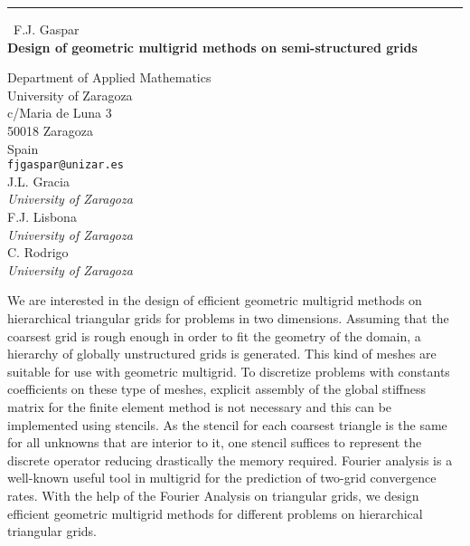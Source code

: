 \documentclass{report}
\begin{document}
\begin{center}
\rule{6in}{1pt} \
{\large F.J. Gaspar \\
{\bf Design of geometric multigrid methods on semi-structured grids}}

Department of Applied Mathematics \\ University of Zaragoza \\ c/Maria de Luna 3 \\ 50018 Zaragoza \\ Spain
\\
{\tt fjgaspar@unizar.es}\\
J.L. Gracia\\
{\em University of Zaragoza}\\
F.J. Lisbona\\
{\em University of Zaragoza}\\
C. Rodrigo\\
{\em University of Zaragoza}\end{center}

We are interested in the design of efficient geometric multigrid methods
on hierarchical triangular grids for problems in two dimensions. Assuming
that the coarsest grid is rough enough in order to fit the geometry of
the domain, a hierarchy of globally unstructured grids is generated. This
kind of meshes are suitable for use with geometric multigrid. To
discretize problems with constants coefficients on these type
of meshes, explicit assembly of the global stiffness matrix for the
finite element method is not necessary and this can be implemented using
stencils. As the stencil for each coarsest triangle is the same for all
unknowns that are interior to it, one stencil suffices to represent the
discrete operator reducing drastically the memory required. Fourier
analysis is a well-known useful tool in multigrid for the prediction of
two-grid convergence rates. With the help of the Fourier Analysis on
triangular grids, we design efficient geometric multigrid methods for
different problems on hierarchical triangular grids.
\end{document}

